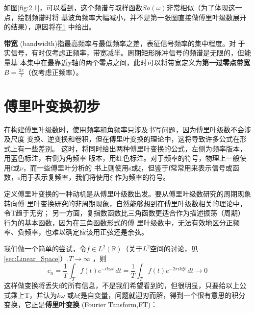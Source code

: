 \documentclass{ctexbook}
\begin{document}
如图\ref{fig:2.1}，可以看到，这个频谱与取样函数$Sa(\omega)$非常相似（为了体现这一点，绘制频谱时将
基波角频率大幅减小，并不是第一张图直接做傅里叶级数展开的结果），原因将在\ref{sec:Fourier}
中给出。

\textbf{带宽} (bandwidth)指最高频率与最低频率之差，表征信号频率的集中程度。对
于实信号，有时仅考虑正频率，带宽减半。周期矩形脉冲信号的频谱是无限的，但能量基
本集中在最靠近y轴的两个零点之间，此时可以将带宽定义为\textbf{第一过零点带宽}
$B=\frac{2\pi}{\tau}$（仅考虑正频率）。

\section{傅里叶变换初步}\label{sec:Fourier}
在构建傅里叶级数时，使用频率和角频率只涉及书写问题，因为傅里叶级数不会涉及尺度
变换、逆变换和卷积，但在傅里叶变换的理论中，这将导致许多公式在形式上有一些差别。
这时，将同时给出两种傅里叶变换的公式，左侧为频率版本，用蓝色标注，右侧为角频率
版本，用红色标注。对于频率的符号，物理上一般使用f或$\nu $，而一些傅里叶分析的
书上则使用s或$\xi$，但鉴于f常常用来表示信号或函数，s用于表示复频率，我们将使用$\xi$
作为频率的符号。

定义傅里叶变换的一种动机是从傅里叶级数出发。要从傅里叶级数研究的周期现象转向傅
里叶变换研究的非周期现象，自然能够想到在傅里叶级数相关的理论中，令T趋于无穷；
另一方面，复指数函数比三角函数更适合作为描述振荡（周期）行为的基本函数，因为在三角函数形式的傅
里叶级数中，无法有效地区分正频率、负频率，也难以确定应该用正弦还是余弦。

我们做一个简单的尝试，令$f\in L^2(\mathbb{R})$（关于$L^2$空间的讨论，见\ref{sec:Linear_Space}）,$T\to \infty$
，则\[c_n=\frac{1}{T}\int_{T}f(t)e^{-ik\omega t}\,dt=\frac{1}{T}\int_{T}f(t)e^{-2\pi ik\xi t}\,dt\to 0\]
这样做变换将丢失f的所有信息，不是我们希望看到的，但很明显，只要给以上公式乘上T，并认为$k\omega$
或$k\xi$是自变量，问题就迎刃而解，得到一个很有意思的积分变换，它正是\textbf{傅里叶变换} (Fourier Tansform,FT)：
\end{document}
